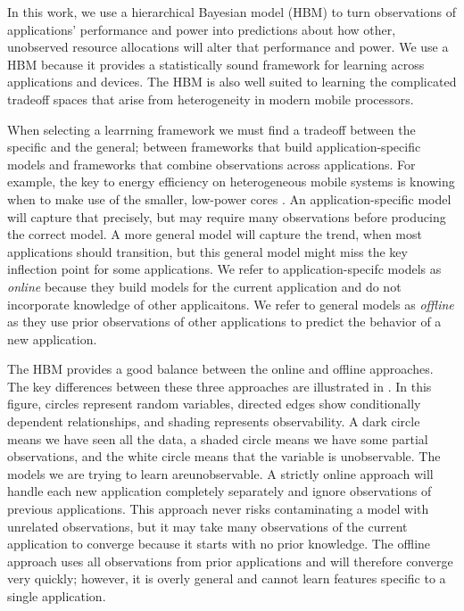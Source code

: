 In this work, we use a hierarchical Bayesian model (HBM) to turn
observations of applications' performance and power into predictions
about how other, unobserved resource allocations will alter that
performance and power.  We use a HBM because it provides a
statistically sound framework for learning across applications and
devices.  The HBM is also well suited to learning the complicated
tradeoff spaces that arise from heterogeneity in modern mobile
processors.

When selecting a learrning framework we must find a tradeoff between
the specific and the general; \ie between frameworks that build
application-specific models and frameworks that combine observations
across applications.  For example, the key to energy efficiency on
heterogeneous mobile systems is knowing when to make use of the
smaller, low-power cores \cite{}.  An application-specific model will
capture that precisely, but may require many observations before
producing the correct model.  A more general model will capture the
trend, \eg when most applications should transition, but this general
model might miss the key inflection point for some applications.  We
refer to application-specifc models as \emph{online} because they
build models for the current application and do not incorporate
knowledge of other applicaitons.  We refer to general models as
\emph{offline} as they use prior observations of other applications to
predict the behavior of a new application.  

The HBM provides a good balance between the online and offline
approaches.  The key differences between these three approaches are
illustrated in . In this figure, circles
represent random variables, directed edges show conditionally
dependent relationships, and shading represents observability.  A dark
circle means we have seen all the data, a shaded circle means we have
some partial observations, and the white circle means that the
variable is unobservable.  The models we are trying to learn
areunobservable.  A strictly online approach will handle each new
application completely separately and ignore observations of previous
applications.  This approach never risks contaminating a model with
unrelated observations, but it may take many observations of the
current application to converge because it starts with no prior
knowledge. The offline approach uses all observations from prior
applications and will therefore converge very quickly; however, it is
overly general and cannot learn features specific to a single
application.

